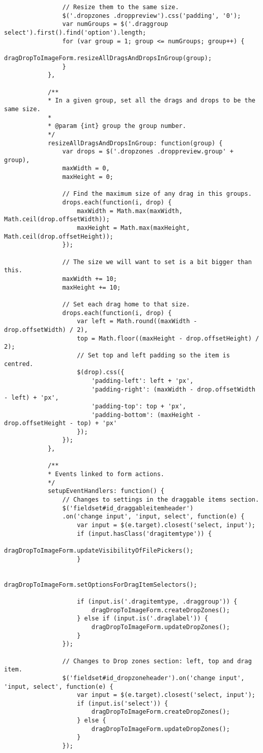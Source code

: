 \begin{lstlisting}
				// Resize them to the same size.
				$('.dropzones .droppreview').css('padding', '0');
				var numGroups = $('.draggroup select').first().find('option').length;
				for (var group = 1; group <= numGroups; group++) {
					dragDropToImageForm.resizeAllDragsAndDropsInGroup(group);
				}
			},
			
			/**
			* In a given group, set all the drags and drops to be the same size.
			*
			* @param {int} group the group number.
			*/
			resizeAllDragsAndDropsInGroup: function(group) {
				var drops = $('.dropzones .droppreview.group' + group),
				maxWidth = 0,
				maxHeight = 0;
				
				// Find the maximum size of any drag in this groups.
				drops.each(function(i, drop) {
					maxWidth = Math.max(maxWidth, Math.ceil(drop.offsetWidth));
					maxHeight = Math.max(maxHeight, Math.ceil(drop.offsetHeight));
				});
				
				// The size we will want to set is a bit bigger than this.
				maxWidth += 10;
				maxHeight += 10;
				
				// Set each drag home to that size.
				drops.each(function(i, drop) {
					var left = Math.round((maxWidth - drop.offsetWidth) / 2),
					top = Math.floor((maxHeight - drop.offsetHeight) / 2);
					// Set top and left padding so the item is centred.
					$(drop).css({
						'padding-left': left + 'px',
						'padding-right': (maxWidth - drop.offsetWidth - left) + 'px',
						'padding-top': top + 'px',
						'padding-bottom': (maxHeight - drop.offsetHeight - top) + 'px'
					});
				});
			},
			
			/**
			* Events linked to form actions.
			*/
			setupEventHandlers: function() {
				// Changes to settings in the draggable items section.
				$('fieldset#id_draggableitemheader')
				.on('change input', 'input, select', function(e) {
					var input = $(e.target).closest('select, input');
					if (input.hasClass('dragitemtype')) {
						dragDropToImageForm.updateVisibilityOfFilePickers();
					}
					
					dragDropToImageForm.setOptionsForDragItemSelectors();
					
					if (input.is('.dragitemtype, .draggroup')) {
						dragDropToImageForm.createDropZones();
					} else if (input.is('.draglabel')) {
						dragDropToImageForm.updateDropZones();
					}
				});
				
				// Changes to Drop zones section: left, top and drag item.
				$('fieldset#id_dropzoneheader').on('change input', 'input, select', function(e) {
					var input = $(e.target).closest('select, input');
					if (input.is('select')) {
						dragDropToImageForm.createDropZones();
					} else {
						dragDropToImageForm.updateDropZones();
					}
				});
				

\end{lstlisting}
